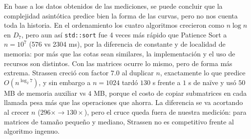 En base a los datos obtenidos de las mediciones, se puede concluir que la complejidad asintótica predice bien la forma de las curvas, pero no nos cuenta toda la historia. En el ordenamiento los cuatro algoritmos crecieron como $n \log n$ en $D_7$, pero aun así \texttt{std::sort} fue 4 veces más rápido que Patience Sort a $n = 10^7$ (576 vs 2304 ms), por la diferencia de constante y de localidad de memoria: por más que las cotas sean similares, la implementación y el uso de recursos son distintos.
Con las matrices ocurre lo mismo, pero de forma más extrema. Strassen creció con factor $7.0$ al duplicar $n$, exactamente lo que predice $O(n^{\log_2 7})$, y sin embargo a $n=1024$ tardó $130$ s frente a $1$ s de naïve y usó $50$ MB de memoria auxiliar vs $4$ MB, porque el costo de copiar submatrices en cada llamada pesa más que las operaciones que ahorra. La diferencia se va acortando al crecer $n$ ($296\times \to 130\times$), pero el cruce queda fuera de nuestra medición: para matrices de tamaño pequeño y mediano, Strassen no es competitivo frente al algoritmo ingenuo.
